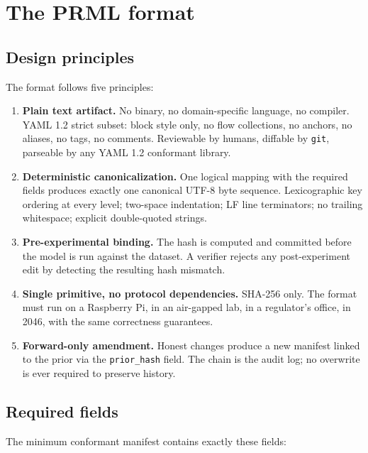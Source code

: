 \documentclass[11pt, a4paper]{article}
\begin{document}
\section{The PRML format}
\label{sec:format}

\subsection{Design principles}

The format follows five principles:

\begin{enumerate}[leftmargin=2em, itemsep=0.3em]
  \item \textbf{Plain text artifact.} No binary, no domain-specific language, no compiler. YAML 1.2 strict subset: block style only, no flow collections, no anchors, no aliases, no tags, no comments. Reviewable by humans, diffable by \texttt{git}, parseable by any YAML 1.2 conformant library.
  \item \textbf{Deterministic canonicalization.} One logical mapping with the required fields produces exactly one canonical UTF-8 byte sequence. Lexicographic key ordering at every level; two-space indentation; LF line terminators; no trailing whitespace; explicit double-quoted strings.
  \item \textbf{Pre-experimental binding.} The hash is computed and committed before the model is run against the dataset. A verifier rejects any post-experiment edit by detecting the resulting hash mismatch.
  \item \textbf{Single primitive, no protocol dependencies.} SHA-256 only. The format must run on a Raspberry Pi, in an air-gapped lab, in a regulator's office, in 2046, with the same correctness guarantees.
  \item \textbf{Forward-only amendment.} Honest changes produce a new manifest linked to the prior via the \texttt{prior\_hash} field. The chain is the audit log; no overwrite is ever required to preserve history.
\end{enumerate}

\subsection{Required fields}

The minimum conformant manifest contains exactly these fields:
\end{document}
